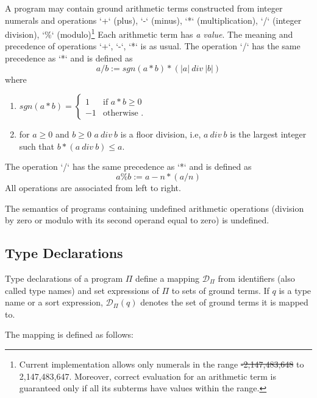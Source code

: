 \documentclass[a4paper,10pt]{article}
\providecommand{\DIFaddtex}[1]{{\protect\color{blue}\uwave{#1}}} %
\providecommand{\DIFdeltex}[1]{{\protect\color{red}\sout{#1}}}                      %
\providecommand{\DIFaddbegin}{} %
\providecommand{\DIFaddend}{} %
\providecommand{\DIFdelbegin}{} %
\providecommand{\DIFdelend}{} %
\providecommand{\DIFadd}[1]{\texorpdfstring{\DIFaddtex{#1}}{#1}} %
\providecommand{\DIFdel}[1]{\texorpdfstring{\DIFdeltex{#1}}{}} %
\begin{document}
A program may contain ground arithmetic terms constructed from integer numerals and operations `+` (plus),  `-` (minus), `*` (multiplication), `/` (integer division), `\%` (modulo)\footnote{Current implementation allows only numerals in the range \DIFdelbegin \DIFdel{-2,147,483,648 }\DIFdelend \DIFaddbegin \DIFadd{0 }\DIFaddend to 2,147,483,647. Moreover, correct evaluation for an arithmetic term is guaranteed only if all its subterms have values within the range.} Each arithmetic term  has \textit{a value}. 
The meaning and precedence of operations  `+`,  `-`, `*` is as usual. The  operation `/` has the same precedence as `*` and is defined as $$a/b := sgn(a*b) *(|a|~div~|b|)$$
where 
\begin{enumerate}
\item $sgn(a*b) = \begin{cases} 1 &\mbox{if } a *b \ge 0 \\
-1 & \mbox{otherwise }. \end{cases} $
\item for $a\ge 0$ and $b\ge0$ $a~div~b$ is a floor division, i.e, $a~div~b$ is the largest integer such that $b * (a~div~b)  \le  a$.
\end{enumerate}
The  operation `/` has the same precedence as `*` and is defined as $$a\%b := a - n * (a/n) $$
All operations are associated from left to right. 


\medskip\noindent
The semantics of programs containing undefined arithmetic operations (division by zero or modulo with its second operand equal to zero) is undefined.  

  


\subsection{Type Declarations} \label{types}
Type declarations of a program $\Pi$  define a mapping $\mathcal{D}_\Pi$ from identifiers (also called type names) and set expressions of $\Pi$  to sets of ground terms. If $q$ is a type name or a sort expression, $\mathcal{D}_\Pi(q)$  denotes the set of ground terms it is mapped to. 


\medskip\noindent 
The mapping is defined as follows:
\end{document}
